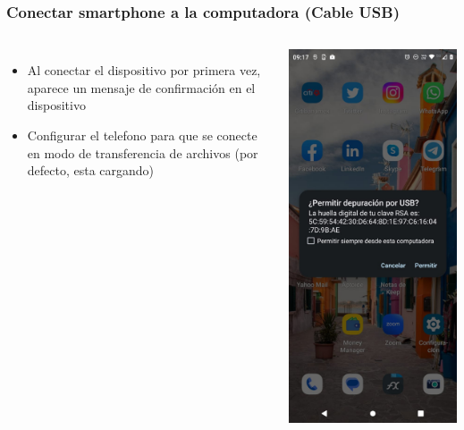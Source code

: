 \begin{frame}
\frametitle{Conectar smartphone a la computadora (Cable USB)}  
\begin{columns}
\begin{itemize}
\item Al conectar el dispositivo por primera vez, aparece un mensaje de confirmaci\'on en el dispositivo
\item Configurar el telefono para que se conecte en modo de transferencia de archivos (por defecto, esta cargando)
\end{itemize}

\begin{center}
\includegraphics[width=0.95\linewidth]{00_Configurar/HabilitarDepuracionUSB2.jpg}    

\end{center}
\end{columns}
\end{frame}
